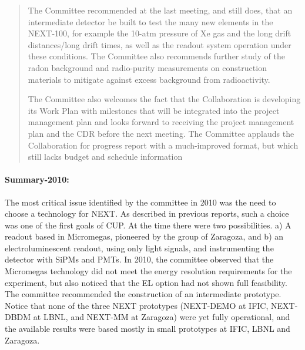 \begin{quotation}
 The Committee recommended at the last meeting, and still does, that an intermediate detector be built to test the many new elements in the NEXT-100, for example the 10-atm pressure of Xe gas and the long drift distances/long drift times, as well as the readout system operation under these conditions. The Committee also recommends further study of the radon background and radio-purity measurements on construction materials to mitigate against excess background from radioactivity.

The Committee also welcomes the fact that the Collaboration is developing its Work Plan with milestones that will be integrated into the project management plan and looks forward to receiving the project management plan and the CDR before the next meeting. The Committee applauds the Collaboration for progress report with a much-improved format, but which still lacks budget and schedule information
\end{quotation}

\paragraph{Summary-2010:} The most critical issue identified by the committee in 2010 was the need to choose a technology for NEXT. As described in previous reports, such a choice was one of the first goals of CUP. At the time there were two possibilities. a) A readout based in Micromegas, pioneered by the group of Zaragoza, and b) an electroluminescent readout, using only light signals, and instrumenting the detector with SiPMs and PMTs. In 2010, the committee observed that the Micromegas technology did not meet the energy resolution requirements for the experiment, but also noticed that the EL option had not shown full feasibility. The committee recommended the construction of an intermediate prototype. Notice that none of the three NEXT prototypes (NEXT-DEMO at IFIC, NEXT-DBDM at LBNL, and NEXT-MM at Zaragoza) were yet fully operational, and the available results were based mostly in small prototypes at IFIC, LBNL and Zaragoza. 

